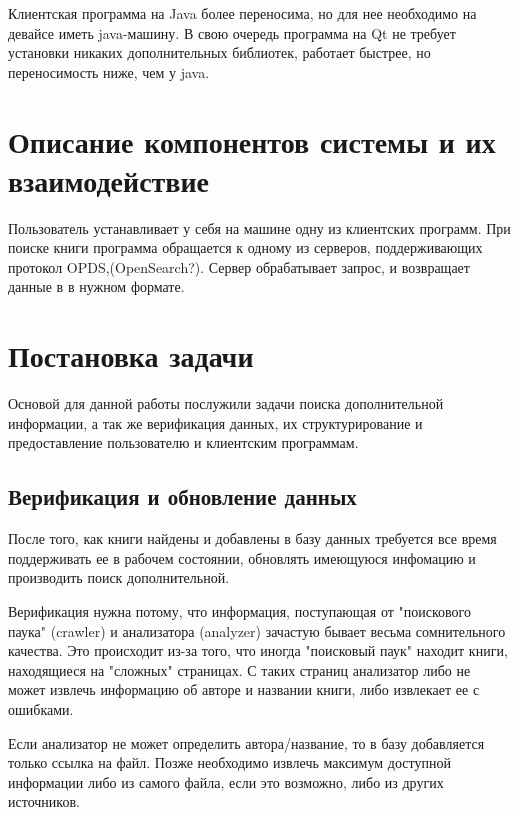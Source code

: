 \documentclass[a4paper]{report}
\begin{document}
Клиентская программа на Java более переносима, но для нее необходимо на девайсе иметь java-машину. В свою очередь программа на Qt не требует установки никаких дополнительных библиотек, работает быстрее, но переносимость ниже, чем у java.
		
\section{Описание компонентов системы и их взаимодействие}


Пользователь устанавливает у себя на машине одну из клиентских программ. При поиске книги программа обращается к одному из серверов, поддерживающих протокол OPDS,(OpenSearch?). Сервер обрабатывает запрос, и возвращает данные в в нужном формате. 





\section{Постановка задачи}

Основой для данной работы послужили задачи поиска дополнительной информации, а так же верификация данных, их структурирование  и предоставление пользователю и клиентским программам.


\subsection{Верификация и обновление данных}

После того, как книги найдены и добавлены в базу данных требуется все время поддерживать ее в рабочем состоянии, обновлять имеющуюся инфомацию и производить поиск дополнительной.

Верификация нужна потому, что информация, поступающая от "поискового паука" (crawler) и анализатора (analyzer) зачастую бывает весьма сомнительного качества. Это происходит из-за того, что иногда "поисковый паук" находит книги, находящиеся на "сложных" страницах. С таких страниц анализатор либо не может извлечь информацию об авторе и названии книги, либо извлекает ее с ошибками. 

Если анализатор не может определить автора/название, то в базу добавляется только ссылка на файл. Позже необходимо извлечь максимум доступной информации либо из самого файла, если это возможно, либо из других источников.
\end{document}
